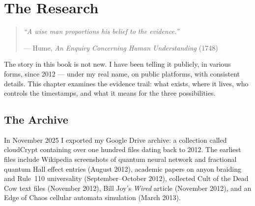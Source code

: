 
\chapter{The Research}
\label{pos34:the-research}

\begin{quote}\small\textit{%
``A wise man proportions his belief to the evidence.''%
}\par\raggedleft --- Hume, \textit{An Enquiry Concerning Human Understanding} (1748)\end{quote}

\vspace{0.5cm}



The story in this book is not new. I have been telling it publicly, in various forms, since 2012 --- under my real name, on public platforms, with consistent details. This chapter examines the evidence trail: what exists, where it lives, who controls the timestamps, and what it means for the three possibilities.

\section*{The Archive}
\label{pos34:the-archive}


In November 2025 I exported my Google Drive archive: a collection called cloudCrypt containing over one hundred files dating back to 2012. The earliest files include Wikipedia screenshots of quantum neural network and fractional quantum Hall effect entries (August 2012), academic papers on anyon braiding and Rule~110 universality (September--October 2012), collected Cult of the Dead Cow text files (November 2012), Bill Joy's \textit{Wired} article (November 2012), and an Edge of Chaos cellular automata simulation (March 2013).

